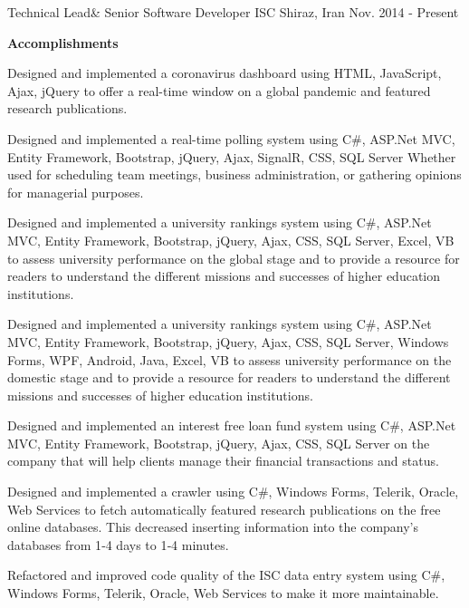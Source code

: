 


\begin{cventries}


\cventry
{Technical Lead\& Senior Software Developer} %
{ISC} %
{Shiraz, Iran} %
{Nov. 2014 - Present} %
{}

\cventry
{\textbf{Accomplishments}} %
{} %
{} %
{} %
{ %
\begin{cvitems}
\item {Designed and implemented a coronavirus dashboard using HTML, JavaScript, Ajax, jQuery to offer a real-time window on a global pandemic and featured research publications.}
\item {Designed and implemented a real-time polling system using C\#, ASP.Net MVC, Entity Framework, Bootstrap, jQuery, Ajax, SignalR, CSS, SQL Server Whether used for scheduling team meetings, business administration, or gathering opinions for managerial purposes.}
\item {Designed and implemented a university rankings system using C\#, ASP.Net MVC, Entity Framework, Bootstrap, jQuery, Ajax, CSS, SQL Server, Excel, VB to assess university performance on the global stage and to provide a resource for readers to understand the different missions and successes of higher education institutions.}
\item {Designed and implemented a university rankings system using C\#, ASP.Net MVC, Entity Framework, Bootstrap, jQuery, Ajax, CSS, SQL Server, Windows Forms, WPF, Android, Java, Excel, VB to assess university performance on the domestic stage and to provide a resource for readers to understand the different missions and successes of higher education institutions.}
\item {Designed and implemented an interest free loan fund system using C\#, ASP.Net MVC, Entity Framework, Bootstrap, jQuery, Ajax, CSS, SQL Server on the company that will help clients manage their financial transactions and status.}
\item {Designed and implemented a crawler using C\#, Windows Forms, Telerik, Oracle, Web Services to fetch automatically featured research publications on the free online databases. This decreased inserting information into the company's databases from 1‑4 days to 1‑4 minutes.}
\item {Refactored and improved code quality of the ISC data entry system using C\#, Windows Forms, Telerik, Oracle, Web Services to make it more maintainable.}
\end{cvitems}
}


\end{cventries}
